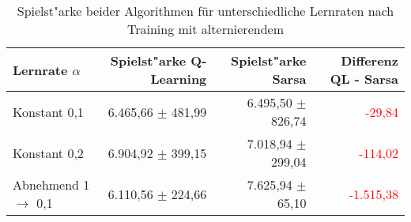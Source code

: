 \begin{table}
\centering
\caption[Spielstärke beider Algorithmen unterschiedliche Lernraten, alternierendes \splay]{Spielst"arke beider Algorithmen für unterschiedliche Lernraten nach Training mit alternierendem \splay}
\label{tab:playingAbility_compareAlgorithms_alternate}

\begin{tabular}{lrrr}
\toprule
Lernrate $\alpha$               & Spielst"arke Q-Learning           & Spielst"arke Sarsa                & Differenz QL - Sarsa \\ \midrule
Konstant 0,1                    & 6.465,66 $\pm$ 481,99             & 6.495,50 $\pm$ 826,74             & \textcolor{red}{-29,84} \\
Konstant 0,2                    & 6.904,92 $\pm$ 399,15             & 7.018,94 $\pm$ 299,04             & \textcolor{red}{-114,02} \\
Abnehmend 1 $\rightarrow$ 0,1   & 6.110,56 $\pm$ 224,66             & 7.625,94 $\pm$ \phantom{0}65,10   & \textcolor{red}{-1.515,38} \\ \bottomrule
\end{tabular}
\end{table}